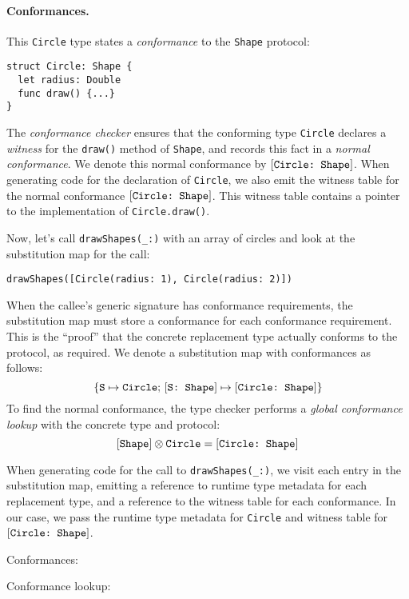 \documentclass[../generics]{subfiles}
\begin{document}
\paragraph{Conformances.} This \texttt{Circle} type states a \emph{conformance} to the \texttt{Shape} protocol:
\begin{Verbatim}
struct Circle: Shape {
  let radius: Double
  func draw() {...}
}
\end{Verbatim}
The \emph{conformance checker} ensures that the conforming type \texttt{Circle} declares a \emph{witness} for the \texttt{draw()} method of \texttt{Shape}, and records this fact in a \emph{normal conformance}. We denote this normal conformance by $[\texttt{Circle:~Shape}]$. When generating code for the declaration of \texttt{Circle}, we also emit the witness table for the normal conformance $[\texttt{Circle:~Shape}]$. This witness table contains a pointer to the implementation of \texttt{Circle.draw()}.

Now, let's call \verb|drawShapes(_:)| with an array of circles and look at the substitution map for the call:
\begin{Verbatim}
drawShapes([Circle(radius: 1), Circle(radius: 2)])
\end{Verbatim}
When the callee's generic signature has conformance requirements, the substitution map must store a conformance for each conformance requirement. This is the ``proof'' that the concrete replacement type actually conforms to the protocol, as required. We denote a substitution map with conformances as follows:
\[\{\texttt{S} \mapsto \texttt{Circle};\,[\texttt{S:~Shape}] \mapsto [\texttt{Circle:~Shape}]\}\]
To find the normal conformance, the type checker performs a \emph{global conformance lookup} with the concrete type and protocol:
\[[\texttt{Shape}]\otimes\texttt{Circle}=[\texttt{Circle:~Shape}]\]

When generating code for the call to \verb|drawShapes(_:)|, we visit each entry in the substitution map, emitting a reference to runtime type metadata for each replacement type, and a reference to the witness table for each conformance. In our case, we pass the runtime type metadata for \texttt{Circle} and witness table for $[\texttt{Circle:~Shape}]$.

\begin{MoreDetails}
\item Conformances: 
\item Conformance lookup: 
\end{MoreDetails}
\end{document}
